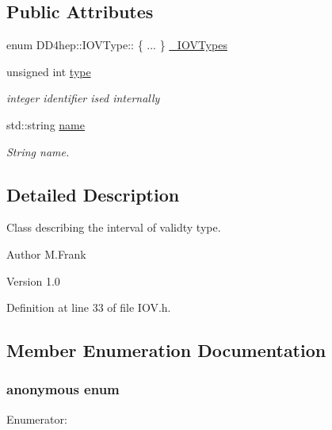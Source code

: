 \subsection*{Public Attributes}
\begin{DoxyCompactItemize}
\item 
enum DD4hep::IOVType:: \{ ... \}  \hyperlink{class_d_d4hep_1_1_i_o_v_type_a065ca1030c72dec59bd0c6533acaa1da}{\_\-IOVTypes}
\item 
unsigned int \hyperlink{class_d_d4hep_1_1_i_o_v_type_a8387532d69591a4379b8f84fa2302c5a}{type}
\begin{DoxyCompactList}\small\item\em integer identifier ised internally \item\end{DoxyCompactList}\item 
std::string \hyperlink{class_d_d4hep_1_1_i_o_v_type_ac4fa3d6c589f183137625501e757234e}{name}
\begin{DoxyCompactList}\small\item\em String name. \item\end{DoxyCompactList}\end{DoxyCompactItemize}


\subsection{Detailed Description}
Class describing the interval of validty type. \begin{DoxyAuthor}{Author}
M.Frank 
\end{DoxyAuthor}
\begin{DoxyVersion}{Version}
1.0 
\end{DoxyVersion}


Definition at line 33 of file IOV.h.

\subsection{Member Enumeration Documentation}
\hypertarget{class_d_d4hep_1_1_i_o_v_type_acef1483c5ce503d44367cf75875c5797}{
\subsubsection[{"@3}]{\setlength{\rightskip}{0pt plus 5cm}anonymous enum}}
\label{class_d_d4hep_1_1_i_o_v_type_acef1483c5ce503d44367cf75875c5797}
\begin{Desc}
\item[Enumerator: ]\par
\begin{description}
\item[{\em 
\hypertarget{class_d_d4hep_1_1_i_o_v_type_acef1483c5ce503d44367cf75875c5797aa035632674476d28a4b2a6445303c220}{
UNKNOWN\_\-IOV}
\label{class_d_d4hep_1_1_i_o_v_type_acef1483c5ce503d44367cf75875c5797aa035632674476d28a4b2a6445303c220}
}]\end{description}
\end{Desc}




